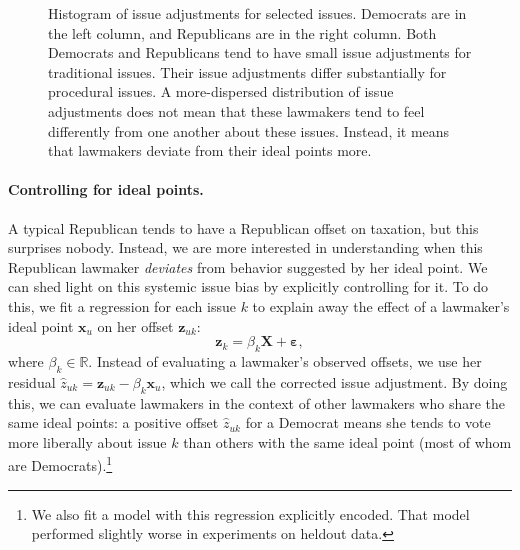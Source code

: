 \begin{figure}
\begin{tabular}{cc}
  \end{tabular}
  \caption{Histogram of issue adjustments for selected
    issues. Democrats are in the left column, and Republicans are in
    the right column. Both Democrats and Republicans tend to have
    small issue adjustments for traditional issues.  Their issue
    adjustments differ substantially for procedural issues. A
    more-dispersed distribution of issue adjustments does not mean
    that these lawmakers tend to feel differently from one another
    about these issues.  Instead, it means that lawmakers deviate from
    their ideal points more.  }
  \label{fig:issue_adjustment_distribution}
\end{figure}

\label{sec:conditional_offsets}

\paragraph{Controlling for ideal points.}

A typical Republican tends to have a Republican offset on taxation,
but this surprises nobody.  Instead, we are more interested in
understanding when this Republican lawmaker \emph{deviates} from
behavior suggested by her ideal point.  We can shed light on this
systemic issue bias by explicitly controlling for it.  To do this, we
fit a regression for each issue $k$ to explain away the effect of a
lawmaker's ideal point $\bm x_u$ on her offset $\bm z_{uk}$:
\[
  \bm z_{k} = \beta_k \bm X + \bm \varepsilon,
\]
where $\beta_k \in \mathbb{R}$.  Instead of evaluating a lawmaker's
observed offsets, we use her residual $\hat z_{uk} = \bm z_{uk} -
\beta_k \bm x_u$, which we call the corrected issue adjustment.  By
doing this, we can evaluate lawmakers in the context of other
lawmakers who share the same ideal points: a positive offset $\hat
z_{uk}$ for a Democrat means she tends to vote more liberally about
issue $k$ than others with the same ideal point (most of whom are
Democrats).\footnote{We also fit a model with this regression
  explicitly encoded.  That model performed slightly worse in
  experiments on heldout data.}

